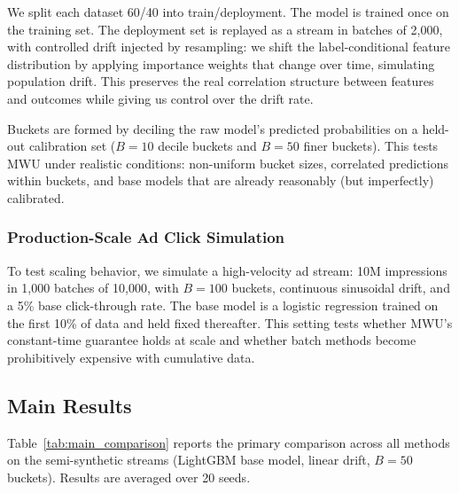 \documentclass[12pt, letterpaper]{article}
\theoremstyle{definition}
\theoremstyle{remark}
\begin{document}
We split each dataset 60/40 into train/deployment. The model is trained once on the training set. The deployment set is replayed as a stream in batches of 2,000, with controlled drift injected by resampling: we shift the label-conditional feature distribution by applying importance weights that change over time, simulating population drift. This preserves the real correlation structure between features and outcomes while giving us control over the drift rate.

Buckets are formed by deciling the raw model's predicted probabilities on a held-out calibration set ($B = 10$ decile buckets and $B = 50$ finer buckets). This tests MWU under realistic conditions: non-uniform bucket sizes, correlated predictions within buckets, and base models that are already reasonably (but imperfectly) calibrated.

\subsubsection{Production-Scale Ad Click Simulation}

To test scaling behavior, we simulate a high-velocity ad stream: 10M impressions in 1,000 batches of 10,000, with $B = 100$ buckets, continuous sinusoidal drift, and a 5\% base click-through rate. The base model is a logistic regression trained on the first 10\% of data and held fixed thereafter. This setting tests whether MWU's constant-time guarantee holds at scale and whether batch methods become prohibitively expensive with cumulative data.

\subsection{Main Results}

Table~\ref{tab:main_comparison} reports the primary comparison across all methods on the semi-synthetic streams (LightGBM base model, linear drift, $B = 50$ buckets). Results are averaged over 20 seeds.
\end{document}
